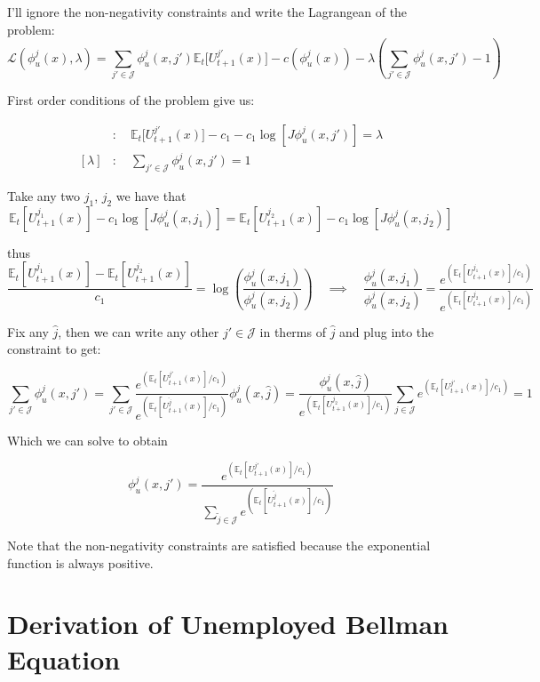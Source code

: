 \documentclass[
  letterpaper,
  DIV=11,
  numbers=noendperiod]{scrreprt}
\begin{document}
I'll ignore the non-negativity constraints and write the Lagrangean of
the problem:
\[\mathcal{L}(\phi^j_u(x), \lambda) =  \sum_{j'\in\mathcal{J}} \phi^j_u(x, j')\mathbb{E}_t\Big[U^{j'}_{t+1}(x)  \Big] -c(\phi^j_u(x)) - \lambda \left(\sum_{j'\in \mathcal{J}}\phi^j_u(x, j') - 1\right)\]

First order conditions of the problem give us:

\begin{align*}
  [\phi^j_u(x, j')] &:\quad \mathbb{E}_t\Big[U^{j'}_{t+1}(x)  \Big] - c_1 - c_1 \log[J \phi^j_u(x, j')] = \lambda \\
  [\lambda] &: \quad \sum_{j'\in \mathcal{J}}\phi^j_u(x, j') = 1
\end{align*}

Take any two \(j_1\), \(j_2\) we have that
\[\mathbb{E}_t\left[U^{j_1}_{t+1}(x)  \right] - c_1 \log[J \phi^j_u(x, j_1)] = \mathbb{E}_t\left[U^{j_2}_{t+1}(x)  \right] - c_1 \log[J \phi^j_u(x, j_2)]\]

thus
\[\frac{\mathbb{E}_t\left[U^{j_1}_{t+1}(x)\right] - \mathbb{E}_t\left[U^{j_2}_{t+1}(x)\right]}{c_1} = \log\left(\frac{ \phi^j_u(x, j_1)}{ \phi^j_u(x, j_2)}\right) \quad \implies \quad \frac{ \phi^j_u(x, j_1)}{ \phi^j_u(x, j_2)} = \frac{e^{\left(\mathbb{E}_t\left[U^{j_1}_{t+1}(x)\right] /c_1\right)}}{e^{\left(\mathbb{E}_t\left[U^{j_2}_{t+1}(x)\right] /c_1\right)}}\]

Fix any \(\hat{j}\), then we can write any other \(j'\in\mathcal{J}\) in
therms of \(\hat{j}\) and plug into the constraint to get:

\[\sum_{j'\in \mathcal{J}}\phi^j_u(x, j') =\sum_{j'\in \mathcal{J}}\frac{e^{\left(\mathbb{E}_t\left[U^{j'}_{t+1}(x)\right] /c_1\right)}}{e^{\left(\mathbb{E}_t\left[U^{\hat{j}}_{t+1}(x)\right] /c_1\right)}} \phi^j_u(x, \hat{j}) = \frac{\phi^j_u(x, \hat{j})}{e^{\left(\mathbb{E}_t\left[U^{j_2}_{t+1}(x)\right] /c_1\right)}} \sum_{j\in \mathcal{J}}e^{\left(\mathbb{E}_t\left[U^{j'}_{t+1}(x)\right] /c_1\right)} = 1\]

Which we can solve to obtain

\[\boxed{
  \phi^j_u(x,j') = \frac{e^{\left(\mathbb{E}_t\left[U^{j'}_{t+1}(x)\right] /c_1\right)}}{\sum_{\tilde{j}\in \mathcal{J}}e^{\left(\mathbb{E}_t\left[U^{\tilde{j}}_{t+1}(x)\right] /c_1\right)}}}\]

Note that the non-negativity constraints are satisfied because the
exponential function is always positive.

\hypertarget{sec-appendix_bellman_unemp}{%
\chapter{Derivation of Unemployed Bellman
Equation}\label{sec-appendix_bellman_unemp}}
\end{document}
